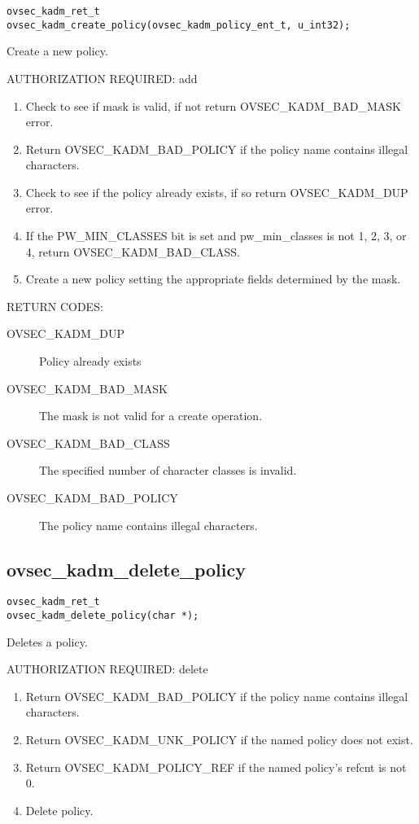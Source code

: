 \begin{verbatim}
ovsec_kadm_ret_t
ovsec_kadm_create_policy(ovsec_kadm_policy_ent_t, u_int32); 
\end{verbatim}

Create a new policy.

AUTHORIZATION REQUIRED: add

\begin{enumerate}
\item Check to see if mask is valid, if not return OVSEC_KADM_BAD_MASK error.
\item Return OVSEC_KADM_BAD_POLICY if the policy name contains illegal
characters.

\item Check to see if the policy already exists, if so return
OVSEC_KADM_DUP error. 
\item If the PW_MIN_CLASSES bit is set and pw_min_classes is not 1, 2,
3, or 4, return OVSEC_KADM_BAD_CLASS.
\item Create a new policy setting the appropriate fields determined
by the mask.
\end{enumerate}

RETURN CODES:

\begin{description}
\item[OVSEC_KADM_DUP] Policy already exists
\item[OVSEC_KADM_BAD_MASK] The mask is not valid for a create
operation.
\item[OVSEC_KADM_BAD_CLASS] The specified number of character classes
is invalid.
\item[OVSEC_KADM_BAD_POLICY] The policy name contains illegal characters.
\end{description}

\subsection{ovsec_kadm_delete_policy}

\begin{verbatim}
ovsec_kadm_ret_t
ovsec_kadm_delete_policy(char *);
\end{verbatim}

Deletes a policy.

AUTHORIZATION REQUIRED: delete

\begin{enumerate}
\item Return OVSEC_KADM_BAD_POLICY if the policy name contains illegal
characters.
\item Return OVSEC_KADM_UNK_POLICY if the named policy does not exist.
\item Return OVSEC_KADM_POLICY_REF if the named policy's refcnt is not 0.
\item Delete policy.
\end{enumerate}

